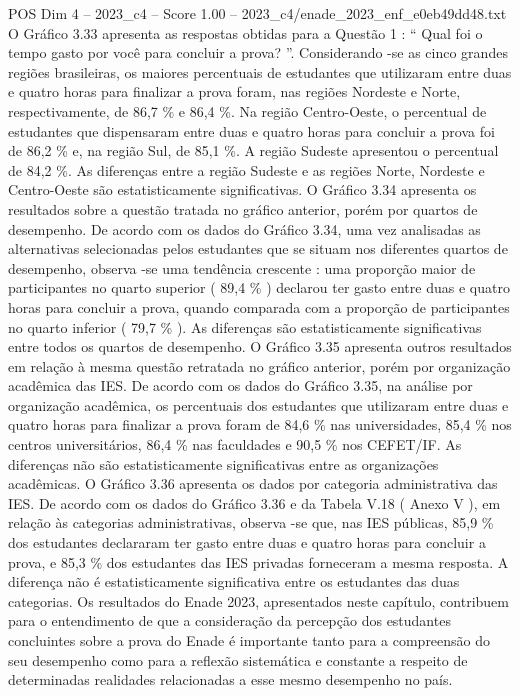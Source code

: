 \begin{textsample}{POS Dim 4 – 2023\_c4 – Score 1.00 – 2023\_c4/enade\_2023\_enf\_e0eb49dd48.txt}
O Gráfico 3.33 apresenta as respostas obtidas para a Questão 1 : “ Qual foi o tempo gasto por você para concluir a prova? ”.
Considerando -se as cinco grandes regiões brasileiras, os maiores percentuais de estudantes que utilizaram entre duas e quatro horas para finalizar a prova foram, nas regiões Nordeste e Norte, respectivamente, de 86,7 \% e 86,4 \%.
Na região Centro-Oeste, o percentual de estudantes que dispensaram entre duas e quatro horas para concluir a prova foi de 86,2 \% e, na região Sul, de 85,1 \%.
A região Sudeste apresentou o percentual de 84,2 \%.
As diferenças entre a região Sudeste e as regiões Norte, Nordeste e Centro-Oeste são estatisticamente significativas.
O Gráfico 3.34 apresenta os resultados sobre a questão tratada no gráfico anterior, porém por quartos de desempenho.
De acordo com os dados do Gráfico 3.34, uma vez analisadas as alternativas selecionadas pelos estudantes que se situam nos diferentes quartos de desempenho, observa -se uma tendência crescente : uma proporção maior de participantes no quarto superior ( 89,4 \% ) declarou ter gasto entre duas e quatro horas para concluir a prova, quando comparada com a proporção de participantes no quarto inferior ( 79,7 \% ).
As diferenças são estatisticamente significativas entre todos os quartos de desempenho.
O Gráfico 3.35 apresenta outros resultados em relação à mesma questão retratada no gráfico anterior, porém por organização acadêmica das IES.
De acordo com os dados do Gráfico 3.35, na análise por organização acadêmica, os percentuais dos estudantes que utilizaram entre duas e quatro horas para finalizar a prova foram de 84,6 \% nas universidades, 85,4 \% nos centros universitários, 86,4 \% nas faculdades e 90,5 \% nos CEFET/IF.
As diferenças não são estatisticamente significativas entre as organizações acadêmicas.
O Gráfico 3.36 apresenta os dados por categoria administrativa das IES.
De acordo com os dados do Gráfico 3.36 e da Tabela V.18 ( Anexo V ), em relação às categorias administrativas, observa -se que, nas IES públicas, 85,9 \% dos estudantes declararam ter gasto entre duas e quatro horas para concluir a prova, e 85,3 \% dos estudantes das IES privadas forneceram a mesma resposta.
A diferença não é estatisticamente significativa entre os estudantes das duas categorias.
Os resultados do Enade 2023, apresentados neste capítulo, contribuem para o entendimento de que a consideração da percepção dos estudantes concluintes sobre a prova do Enade é importante tanto para a compreensão do seu desempenho como para a reflexão sistemática e constante a respeito de determinadas realidades relacionadas a esse mesmo desempenho no país.

\end{textsample}
